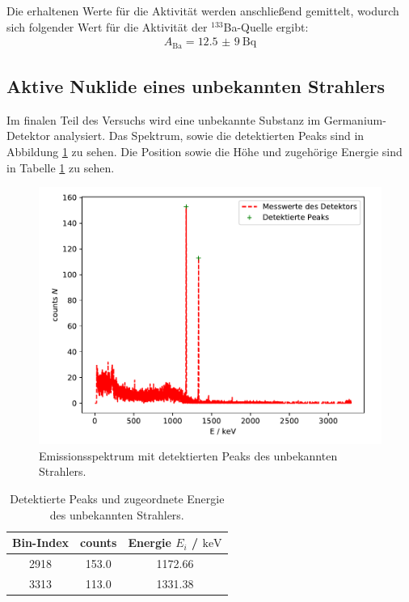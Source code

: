 \FloatBarrier
Die erhaltenen Werte für die Aktivität werden anschließend gemittelt, wodurch sich folgender Wert für die Aktivität der $^{133}$Ba-Quelle ergibt:
\begin{align*}
    A_\text{Ba} = \SI{12,5(9)}{\becquerel}
\end{align*}
\FloatBarrier


\subsection{Aktive Nuklide eines unbekannten Strahlers}
Im finalen Teil des Versuchs wird eine unbekannte Substanz im Germanium-Detektor analysiert. Das Spektrum, sowie die detektierten Peaks sind in Abbildung \ref{abb:unbekannt} zu sehen. Die Position sowie die Höhe und zugehörige Energie sind in Tabelle \ref{tab:unbekannt} zu sehen.
\FloatBarrier
\begin{figure}
    \centering
    \includegraphics[scale=0.7]{unbekannterStrahler.pdf}
    \caption{Emissionsspektrum mit detektierten Peaks des unbekannten Strahlers.}
    \label{abb:unbekannt}
\end{figure}
\FloatBarrier
\begin{table}
    \centering
    \caption{Detektierte Peaks und zugeordnete Energie des unbekannten Strahlers.}
    \label{tab:unbekannt}
    \begin{tabular}{ c c c }
    \toprule
    {Bin-Index} & {counts } & {Energie $E_i$ / $\si{\kilo\electronvolt}$}\\
    \midrule
    2918 & 153.0 & 1172.66       \\
    3313 & 113.0 & 1331.38       \\
    \bottomrule
    \end{tabular}
\end{table}
\FloatBarrier

